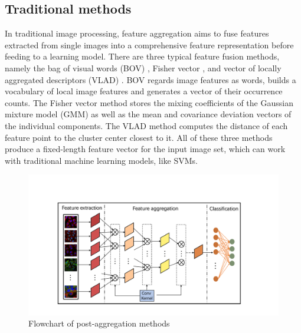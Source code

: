 \documentclass[10pt,twocolumn,letterpaper]{article}
\begin{document}
\subsection{Traditional methods} 
In traditional image processing, feature aggregation aims to fuse features extracted from single images into a comprehensive feature representation before feeding to a learning model. There are three typical feature fusion methods, namely the bag of visual words (BOV) \cite{bov}, Fisher vector \cite{fishervector}, and vector of locally aggregated descriptors (VLAD) \cite{vlad}. BOV regards image features as words, builds a vocabulary of local image features and generates a vector of their occurrence counts. The Fisher vector method stores the mixing coefficients of the Gaussian mixture model (GMM) as well as the mean and covariance deviation vectors of the individual components. The VLAD method computes the distance of each feature point to the cluster center closest to it. All of these three methods produce a fixed-length feature vector for the input image set, which can work with traditional machine learning models, like SVMs.


\begin{figure}
\begin{center}
\includegraphics[width=0.8\linewidth]{FlowChart.pdf}
\end{center}
   \caption{Flowchart of post-aggregation methods}
\label{fig:framework}
\end{figure}
\end{document}
